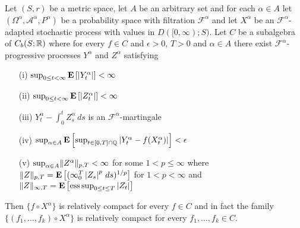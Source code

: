 \begin{thm}Let $(S,r)$ be a metric space, let $A$ be an arbitrary set and for each $\alpha \in A$ let $(\Omega^\alpha, \mathcal{A}^\alpha, P^\alpha)$ be a probability space with filtration $\mathcal{F}^\alpha$ and let $X^\alpha$ be an $\mathcal{F}^\alpha$-adapted stochastic process with values in $D([0,\infty); S)$.  Let $C$ be a subalgebra of $C_b(S; \mathbb{R})$ where for every $f \in C$ and $\epsilon > 0$, $T>0$ and $\alpha \in A$ there exist $\mathcal{F}^\alpha$-progressive processes $Y^\alpha$ and $Z^\alpha$ satisfying
\begin{itemize}
\item[(i)]$\sup_{0 \leq t < \infty} \textbf{E}\left[\left \vert Y^\alpha_t \right \vert\right] < \infty$
\item[(ii)]$\sup_{0 \leq t < \infty} \textbf{E}\left[\left \vert Z^\alpha_t \right \vert\right] < \infty$
\item[(iii)]$Y^\alpha_t - \int_0^t Z^\alpha_s \, ds$ is an $\mathcal{F}^\alpha$-martingale
\item[(iv)]$\sup_{\alpha \in A} \textbf{E}\left[\sup_{t \in [0,T] \cap \mathbb{Q}} \left \vert Y^\alpha_t - f(X^\alpha_t) \right \vert\right] < \epsilon$
\item[(v)]$\sup_{\alpha \in A} \lVert Z^\alpha \rVert_{p, T} < \infty$ for some $1 < p \leq \infty$ where $\lVert Z \rVert_{p, T} = \textbf{E}\left[(\infty_0^T \left \vert Z_s \right \vert^p \, ds)^{1/p}\right]$ for $1 < p < \infty$ and $\lVert Z \rVert_{\infty, T} = \textbf{E}\left[\operatorname*{ess\,sup}_{0 \leq t \leq T} \left \vert Z_t \right \vert\right]$
\end{itemize}
Then $\lbrace f \circ X^\alpha \rbrace$ is relatively compact for every $f \in C$ and in fact the family $\lbrace (f_1, \dotsc, f_k) \circ X^\alpha \rbrace$ is relatively compact for every $f_1, \dotsc, f_k \in C$.
\end{thm}
